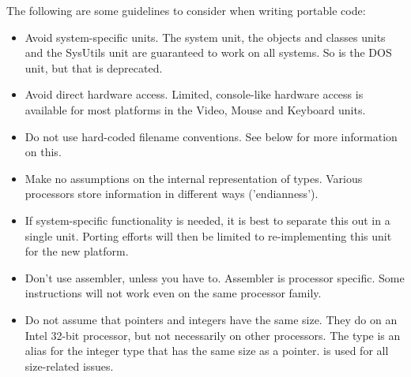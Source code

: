 The following are some guidelines to consider when writing portable code:
\begin{itemize}
\item Avoid system-specific units. The system unit, the objects and 
classes units and the SysUtils unit are guaranteed to work on all 
systems. So is the DOS unit, but that is deprecated. 
\item Avoid direct hardware access. Limited, console-like hardware 
access is available for most platforms in the Video, Mouse and  
Keyboard units.
\item Do not use hard-coded filename conventions. 
See below for more information on this.
\item Make no assumptions on the internal representation of types. Various
processors store information in different ways ('endianness').
\item If system-specific functionality is needed, it is best to 
separate this out in a single unit. Porting efforts will then be 
limited to re-implementing this unit for the new platform.
\item Don't use assembler, unless you have to. Assembler is processor
specific. Some instructions will not work even on the same processor family.
\item Do not assume that pointers and integers have the same size. They do
on an Intel 32-bit processor, but not necessarily on other processors.
The  type is an alias for the integer type that has the same
size as a pointer.  is used for all size-related issues.
\end{itemize}

